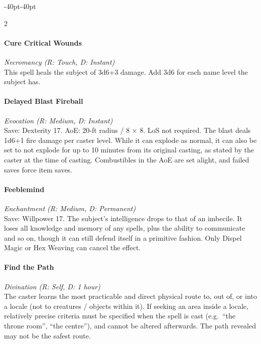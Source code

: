 \documentclass{book}
\begin{document}
\begin{adjustwidth}{-40pt}{-40pt}
\begin{multicols}{2}
\paragraph{Cure Critical Wounds}\label{cure-critical-wounds}

\emph{Necromancy (R: Touch, D: Instant)}\\
This spell heals the subject of 3d6+3 damage. Add 3d6 for each name
level the subject has.

\paragraph{Delayed Blast Fireball}\label{delayed-blast-fireball}

\emph{Evocation (R: Medium, D: Instant)}\\
Save: Dexterity 17. AoE: 20-ft radius / 8 × 8. LoS not required. The
blast deals 1d6+1 fire damage per caster level. While it can explode as
normal, it can also be set to not explode for up to 10 minutes from its
original casting, as stated by the caster at the time of casting.
Combustibles in the AoE are set alight, and failed saves force item
saves.

\paragraph{Feeblemind}\label{feeblemind}

\emph{Enchantment (R: Medium, D: Permanent)}\\
Save: Willpower 17. The subject's intelligence drops to that of an
imbecile. It loses all knowledge and memory of any spells, plus the
ability to communicate and so on, though it can still defend itself in a
primitive fashion. Only Dispel Magic or Hex Weaving can cancel the
effect.

\paragraph{Find the Path}\label{find-the-path}

\emph{Divination (R: Self, D: 1 hour)}\\
The caster learns the most practicable and direct physical route to, out
of, or into a locale (not to creatures / objects within it). If seeking
an area inside a locale, relatively precise criteria must be specified
when the spell is cast (e.g.~``the throne room'', ``the centre''), and
cannot be altered afterwards. The path revealed may not be the safest
route.


\end{multicols}
\end{adjustwidth}
\end{document}
